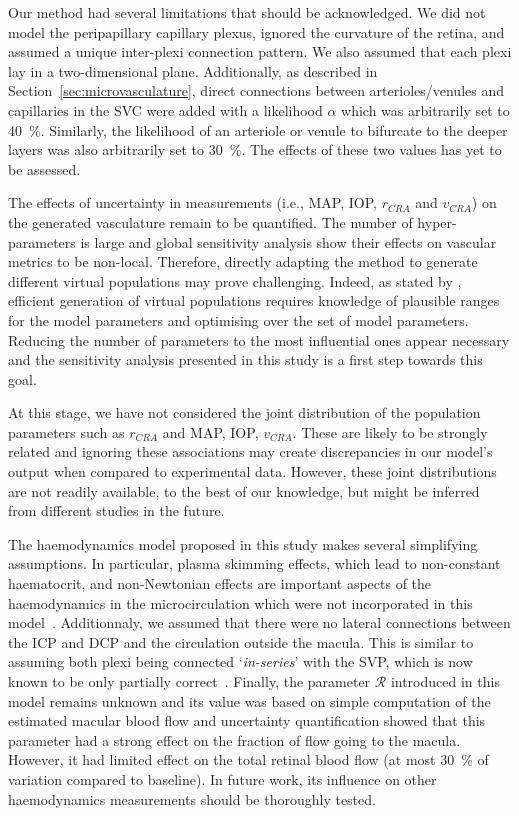\documentclass[11pt,]{article}
\begin{document}
Our method had several limitations that should be acknowledged.
We did not model the peripapillary capillary plexus, ignored the curvature of the retina, and assumed a unique inter-plexi connection pattern.
We also assumed that each plexi lay in a two-dimensional plane.
Additionally, as described in Section~\ref{sec:microvasculature}, direct connections between arterioles/venules and capillaries in the SVC were added with a likelihood $\alpha$ which was arbitrarily set to \SI{40}{\percent}.
Similarly, the likelihood of an arteriole or venule to bifurcate to the deeper layers was also arbitrarily set to \SI{30}{\percent}.
The effects of these two values has yet to be assessed.

The effects of uncertainty in measurements (i.e., MAP, IOP, $r_{CRA}$ and $v_{CRA}$) on the generated vasculature remain to be quantified.
The number of hyper-parameters is large and global sensitivity analysis show their effects on vascular metrics to be non-local.
Therefore, directly adapting the method to generate different virtual populations may prove challenging.
Indeed, as stated by \citet{Allen_2016}, efficient generation of virtual populations requires knowledge of plausible ranges for the model parameters and optimising over the set of model parameters.
Reducing the number of parameters to the most influential ones appear necessary and the sensitivity analysis presented in this study is a first step towards this goal.

At this stage, we have not considered the joint distribution of the population parameters such as $r_{CRA}$ and MAP, IOP, $v_{CRA}$.
These are likely to be strongly related and ignoring these associations may create discrepancies in our model's output when compared to experimental data.
However, these joint distributions are not readily available, to the best of our knowledge, but might be inferred from different studies in the future.

The haemodynamics model proposed in this study makes several simplifying assumptions.
In particular, plasma skimming effects, which lead to non-constant haematocrit, and non-Newtonian effects are important aspects of the haemodynamics in the microcirculation which were not incorporated in this model~\cite{Faahraeus1931,Secomb2013}.
Additionnaly, we assumed that there were no lateral connections between the ICP and DCP and the circulation outside the macula.
This is similar to assuming both plexi being connected `\textit{in-series}' with the SVP, which is now known to be only partially correct~\cite{An2020}.
Finally, the parameter $\mathcal R$ introduced in this model remains unknown and its value was based on simple computation of the estimated macular blood flow and uncertainty quantification showed that this parameter had a strong effect on the fraction of flow going to the macula.
However, it had limited effect on the total retinal blood flow (at most \SI{30}{\percent} of variation compared to baseline).
In future work, its influence on other haemodynamics measurements should be thoroughly tested.
\end{document}
